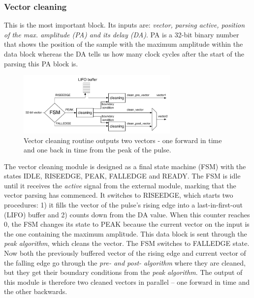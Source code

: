 \documentclass[12pt]{packages/mytustyle}  %
\begin{document}
 
\subsubsection{Vector cleaning}
This is the most important block. Its inputs are: \emph{vector, parsing active, position of the max. amplitude (PA) and its delay (DA)}. PA is a 32-bit binary number that shows the position of the sample with the maximum amplitude within the data block whereas the DA tells us how many clock cycles after the start of the parsing this PA block is.
\begin{figure}[!ht]
\centering
\includegraphics[width=0.7\textwidth]{plots/vector_clean}
\caption{Vector cleaning routine outputs two vectors - one forward in time and one back in time from the peak of the pulse.}
\label{fig:routine}
\end{figure}
The vector cleaning module is designed as a final state machine (FSM) with the states IDLE, RISEEDGE, PEAK, FALLEDGE and READY.  The FSM is idle until it receives the \emph{active} signal from the external module, marking that the vector parsing has commenced. It switches to RISEEDGE, which starts two procedures: 1) it fills the vector of the pulse's rising edge into a last-in-first-out (LIFO) buffer and 2) counts down from the DA value. When this counter reaches 0, the FSM changes its state to PEAK because the current vector on the input is the one containing the maximum amplitude. This data block is sent through the \emph{peak algorithm}, which cleans the vector. The FSM switches to FALLEDGE state. Now both the previously buffered vector of the rising edge and current vector of the falling edge go through the \emph{pre- and post- algorithm} where they are cleaned, but they get their boundary conditions from the \emph{peak algorithm}. The output of this module is therefore two cleaned vectors in parallel -- one forward in time and the other backwards.
\end{document}
